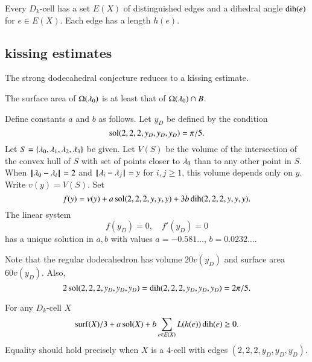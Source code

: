 Every $D_k$-cell has a set $E(X)$ of distinguished edges and a dihedral angle $\operatorname{dih}(e)$ for $e\in E(X)$.  Each edge has a length $h(e)$.

\subsection{kissing estimates}

The strong dodecahedral conjecture reduces to a kissing estimate.

\begin{lemma} The surface area of $\Omega(\lambda_0)$ is at least that
of $\Omega(\lambda_0)\cap B$.
\end{lemma}

\begin{definition}
Define constants $a$ and $b$ as follows.  Let $y_D$ be defined
by the condition
$$
\operatorname{sol}(2,2,2,y_D,y_D,y_D) = \pi/5.
$$
Let $S=\{\lambda_0,\lambda_1,\lambda_2,\lambda_3\}$ be given.  Let $V(S)$ be the
volume of the intersection of the convex hull of $S$ with set of points closer to $\lambda_0$ than to any other point in $S$.  When ${\hskip0.1em|\hskip-0.15em|\hskip0.1em}\lambda_0 - \lambda_i{\hskip0.1em|\hskip-0.15em|\hskip0.1em} = 2$ and ${\hskip0.1em|\hskip-0.15em|\hskip0.1em}\lambda_i - \lambda_j{\hskip0.1em|\hskip-0.15em|\hskip0.1em} = y$ for $i,j\ge 1$, this volume depends
only on $y$. Write $v(y) = V(S)$.  Set
$$
f(y) = v(y) + a \operatorname{sol}(2,2,2,y,y,y) + 3 b \operatorname{dih}(2,2,2,y,y,y).
$$
The linear system
$$
f(y_D) = 0,\quad f'(y_D) = 0
$$
has a unique solution in $a,b$ with values $a=-0.581\ldots$, $b=0.0232\ldots$.
\end{definition}

Note that the regular dodecahedron has volume $20 v(y_D)$ and surface area $60 v(y_D)$.  Also,
$$
2\operatorname{sol}(2,2,2,y_D,y_D,y_D) =\operatorname{dih}(2,2,2,y_D,y_D,y_D)=2\pi/5.
$$

\begin{conjecture}  For any $D_k$-cell $X$
$$
{\operatorname{surf}}(X)/3 + a \operatorname{sol}(X) + b \sum_{e\in E(X)} L(h(e)) \operatorname{dih}(e) \ge 0.
$$
Equality should hold precisely when $X$ is a $4$-cell with edges
$(2,2,2,y_D,y_D,y_D)$.
\end{conjecture}

